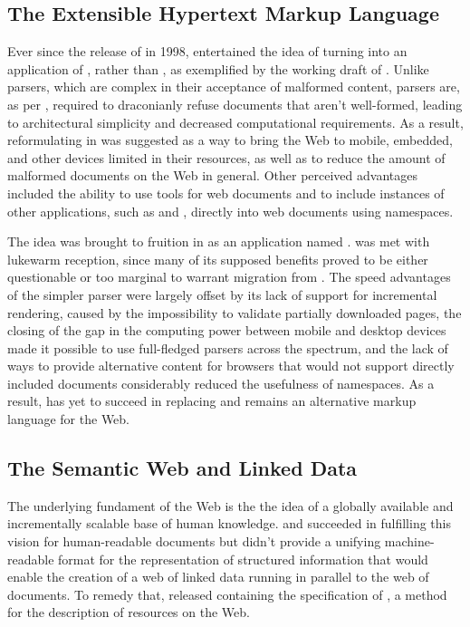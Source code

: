 \documentclass{book}
\begin{document}
\subsection{The Extensible Hypertext Markup Language}
Ever since the release of  in 1998,  entertained the
idea of turning  into an application of , rather than
, as exemplified by the working draft of \cite{raggett98}. Unlike
 parsers, which are complex in their acceptance of malformed
content,  parsers are, as per \cite[Section~1.2,
Terminology]{bray98}, required to draconianly refuse  documents
that aren't well-formed, leading to architectural simplicity and decreased
computational requirements. As a result, reformulating  in
 was suggested as a way to bring the Web to mobile, embedded, and
other devices limited in their resources, as well as to reduce the amount of
malformed documents on the Web in general. Other perceived advantages included
the ability to use  tools for web documents and to include
instances of other  applications, such as  and
, directly into web documents using  namespaces.

The idea was brought to fruition in \cite{pemberton00} as an 
application named .  was met with lukewarm
reception, since many of its supposed benefits proved to be either questionable
or too marginal to warrant migration from . The speed advantages
of the simpler parser were largely offset by its lack of support for incremental
rendering, caused by the impossibility to validate partially downloaded pages,
the closing of the gap in the computing power between mobile and desktop devices
made it possible to use full-fledged  parsers across the spectrum,
and the lack of ways to provide alternative content for browsers that would not
support directly included  documents considerably reduced the
usefulness of  namespaces. As a result,  has yet to
succeed in replacing  and remains an alternative markup language
for the Web.


\subsection{The Semantic Web and Linked Data}
The underlying fundament of the Web is the the idea of a globally available and
incrementally scalable base of human knowledge.  and
 succeeded in fulfilling this vision for human-readable documents
but didn't provide a unifying machine-readable format for the representation of
structured information that would enable the creation of a web of linked data
running in parallel to the web of documents. To remedy that, 
released \cite{lassira99} containing the specification of , a
method for the description of resources on the Web.
\end{document}
